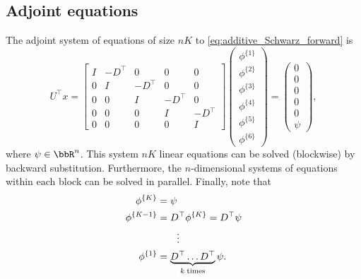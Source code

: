 \subsection{Adjoint equations}
\label{sec:AS_adjoint_problem}
The adjoint system of equations of size $nK$ to \eqref{eq:additive_Schwarz_forward} is
\begin{equation*}
U^\top x
= \left[
\begin{matrix}
   I      &  -D^\top  &     0     &   0       &   0       \\
   0      &     I     &  -D^\top  &   0       &   0       \\
   0      &     0     &     I     &  -D^\top  &   0       \\
   0      &     0     &     0     &   I       &  -D^\top  \\
   0      &     0     &     0     &   0       &   I
\end{matrix}
\right]
\left(
\begin{matrix}
\phi^{\{1\}}  \\
\phi^{\{2\}}  \\
\phi^{\{3\}}  \\
\phi^{\{4\}}  \\
\phi^{\{5\}}  \\
\phi^{\{6\}}
\end{matrix}
\right)
=
\left(
\begin{matrix}
0  \\
0  \\
0  \\
0  \\
0  \\
\psi
\end{matrix}
\right),
\end{equation*}
where $\psi \in \bbR^{n}$. This system $nK$ linear equations can be solved (blockwise) by backward substitution. Furthermore, the $n$-dimensional systems of equations within each block can be solved in parallel. Finally, note that
\begin{equation}
\begin{gathered}\begin{aligned}
\phi^{\{K\}} &= \psi \\
\phi^{\{K-1\}} &= D^\top \phi^{\{K\}} = D^\top \psi \\
&\qquad \vdots \\
\phi^{\{1\}} &= \underbrace{D^\top  \dots  D^\top}_{k \; {\rm times}} \psi.
\end{aligned}\end{gathered}
\end{equation}


